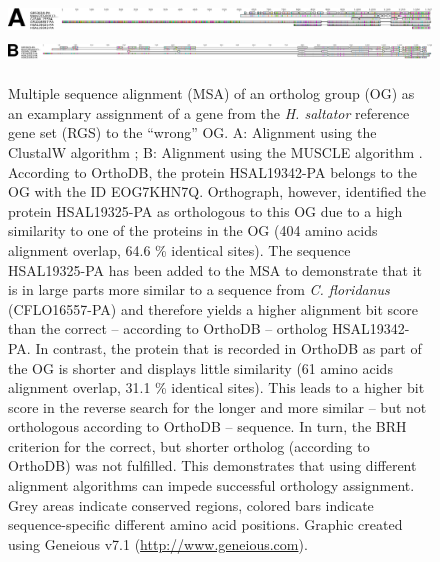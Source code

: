 \begin{figure}
\includegraphics[height=2em]{figures/alignment-clustalw.pdf}\\
\includegraphics[height=2em]{figures/alignment-muscle.pdf}
\caption[Multiple sequence alignments of an ortholog group]{%
Multiple sequence alignment (MSA) of an ortholog group (OG) as an
examplary assignment of a gene from the \emph{H. saltator} reference
gene set (RGS) to the ``wrong'' OG.  A: Alignment using the ClustalW
algorithm \citep{Thompson1994}; B: Alignment using the MUSCLE algorithm
\citep{Edgar2004}.  According to OrthoDB, the protein HSAL19342-PA
belongs to the OG with the ID EOG7KHN7Q.  Orthograph, however,
identified the protein HSAL19325-PA as orthologous to this OG due to a
high similarity to one of the proteins in the OG (404 amino acids
alignment overlap, 64.6 \% identical sites).  The sequence HSAL19325-PA
has been added to the MSA to demonstrate that it is in large parts more
similar to a sequence from \emph{C. floridanus} (CFLO16557-PA) and
therefore yields a higher alignment bit score than the correct --
according to OrthoDB -- ortholog HSAL19342-PA.  In contrast, the protein
that is recorded in OrthoDB as part of the OG is shorter and displays
little similarity (61 amino acids alignment overlap, 31.1 \% identical
sites).  This leads to a higher bit score in the reverse search for the
longer and more similar -- but not orthologous according to OrthoDB --
sequence.  In turn, the BRH criterion for the correct, but shorter
ortholog (according to OrthoDB) was not fulfilled.  This demonstrates
that using different alignment algorithms can impede successful
orthology assignment.  Grey areas indicate conserved regions, colored
bars indicate sequence-specific different amino acid positions.  Graphic
created using Geneious v7.1 (\url{http://www.geneious.com}).}%
\end{figure}


